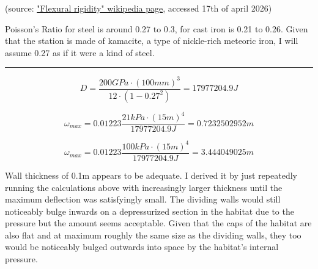 \documentclass[a4paper]{article}
\begin{document}
	(source: \href{https://en.wikipedia.org/wiki/Flexural_rigidity}{"Flexural rigidity" wikipedia page}, accessed 17th of april 2026)
	
	Poisson's Ratio for steel is around 0.27 to 0.3, for cast iron is 0.21 to 0.26.
	Given that the station is made of kamacite, a type of nickle-rich meteoric iron, I will assume 0.27 as if it were a kind of steel.
	
	\begin{center}
		\rule{0.8\linewidth}{0.5pt}
	\end{center}
	
	$$ D = \frac{200GPa \cdot (100mm)^3}{12 \cdot (1 - 0.27^2)} = 17977204.9 J $$
	
	$$ \omega_{max} = 0.01223 \frac{21kPa \cdot (15m)^4}{17977204.9 J} = 0.7232502952 m $$
	
	$$ \omega_{max} = 0.01223 \frac{100kPa \cdot (15m)^4}{17977204.9 J} = 3.444049025 m $$
	
	Wall thickness of 0.1m appears to be adequate.
	I derived it by just repeatedly running the calculations above with increasingly larger thickness until the maximum deflection was satisfyingly small.
	The dividing walls would still noticeably bulge inwards on a depressurized section in the habitat due to the pressure but the amount seems acceptable.
	Given that the caps of the habitat are also flat and at maximum roughly the same size as the dividing walls, they too would be noticeably bulged outwards into space by the habitat's internal pressure.
	
\end{document}
